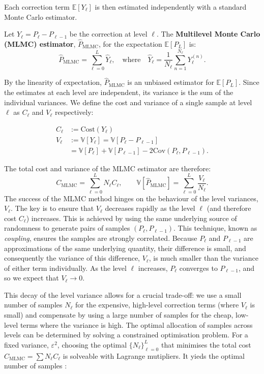 Each correction term $\mathbb{E}[Y_\ell]$ is then estimated independently with a 
standard Monte Carlo estimator.

\begin{definition}\label{def:mlmc_estimator}
    Let $Y_\ell = P_\ell - P_{\ell-1}$ be the correction at level $\ell$. The \textbf{Multilevel Monte Carlo (MLMC) estimator}, $\hat{P}_{\mathrm{MLMC}}$, for the expectation $\mathbb{E}[P_L]$ is:
    \[
    \hat{P}_{\mathrm{MLMC}} = \sum_{\ell=0}^L \hat{Y}_\ell, \quad \text{where} \quad \hat{Y}_\ell = \frac{1}{N_\ell} \sum_{n=1}^{N_\ell} Y_\ell^{(n)}.
    \]
\end{definition}


By the linearity of expectation, $\hat{P}_{\mathrm{MLMC}}$ is an unbiased estimator for 
$\mathbb{E}[P_L]$. Since the estimates at each level are independent, its variance is the sum 
of the individual variances. We define the cost and variance of a single sample at 
level $\ell$ as $C_\ell$ and $V_\ell$ respectively:

\begin{align*}
    C_\ell &:= \text{Cost}(Y_\ell) \\
    V_\ell &:= \mathbb{V}[Y_\ell] = \mathbb{V}[P_\ell - P_{\ell-1}] \\
    &= \mathbb{V}[P_\ell] + \mathbb{V}[P_{\ell - 1}]  - 2 \mathrm{Cov}(P_\ell, P_{\ell - 1}).
\end{align*}

The total cost and variance of the MLMC estimator are therefore:
$$
C_{\mathrm{MLMC}} = \sum_{\ell=0}^L N_\ell C_\ell, \qquad 
\mathbb{V}[\hat{P}_{\mathrm{MLMC}}] = \sum_{\ell=0}^L \frac{V_\ell}{N_\ell}.
$$
The success of the MLMC method hinges on the behaviour of the level variances, 
$V_\ell$. The key is to ensure that $V_\ell$ decreases rapidly as the level $\ell$ 
(and therefore cost $C_\ell$) increases. This is achieved by using the same underlying source of 
randomness to generate pairs of samples $(P_\ell, P_{\ell-1})$. This technique, known as
\textit{coupling}, ensures the samples are strongly correlated. Because 
$P_\ell$ and $P_{\ell - 1}$ are approximations of the same underlying quantity, their difference 
is small, and consequently the variance of this difference, $V_\ell$, is much smaller than the 
variance of either term individually. As the level $\ell$ increases, $P_\ell$ converges to 
$P_{\ell - 1}$, and so we expect that $V_\ell \to 0$.

This decay of the level variance allows for a crucial trade-off: we use a small number 
of samples $N_\ell$ for the expensive, high-level correction terms 
(where $V_\ell$ is small) and compensate by using a large number of samples 
for the cheap, low-level terms where the variance is high. The optimal allocation 
of samples across levels can be determined by solving a constrained optimisation problem.
For a fixed variance, $\varepsilon^2$, choosing the optimal $\{N_\ell\}_{\ell=0}^L$ that 
minimises the total cost $C_{\textrm{MLMC}} = \sum N_\ell C_\ell$ is solveable with 
Lagrange mutipliers. It yieds the optimal number of samples \cite{giles2015multilevel}:

